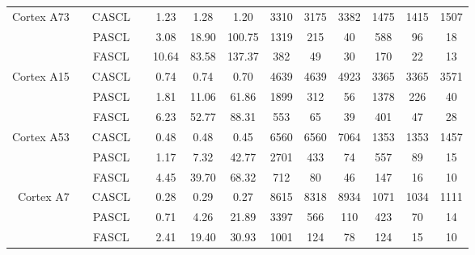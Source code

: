 \begin{table}[t]
{{\begin{tabular}{r|c|c|c c c c| c c c| c c c}
      \hline
      \multirow{3}{*}{\begin{minipage}{0.5in}\centering Cortex A73\end{minipage}} & \multirow{3}{*}{\begin{minipage}{0.5in}\centering 2360\end{minipage}} 
        & CASCL &                     &  1.23  & 1.28   & 1.20   & 3310 & 3175 & 3382 & 1475 & 1415 & 1507 \\
      & & PASCL &                     &  3.08  & 18.90  & 100.75 & 1319 & 215  & 40   & 588  & 96   & 18   \\
      & & FASCL &                     &  10.64 & 83.58  & 137.37 & 382  & 49   & 30   & 170  & 22   & 13   \\

      \hline
      \multirow{3}{*}{\begin{minipage}{0.5in}\centering Cortex A15\end{minipage}} & \multirow{3}{*}{\begin{minipage}{0.5in}\centering 2000\end{minipage}} 
        & CASCL &                     &  0.74  & 0.74   & 0.70   & 4639 & 4639 & 4923 & 3365 & 3365 & 3571 \\
      & & PASCL &                     &  1.81  & 11.06  & 61.86  & 1899 & 312  & 56   & 1378 & 226  & 40   \\
      & & FASCL &                     &  6.23  & 52.77  & 88.31  & 553  & 65   & 39   & 401  & 47   & 28   \\

      \hline
      \multirow{3}{*}{\begin{minipage}{0.5in}\centering Cortex A53\end{minipage}} & \multirow{3}{*}{\begin{minipage}{0.5in}\centering 1840\end{minipage}} 
        & CASCL &                     &  0.48  & 0.48   & 0.45   & 6560 & 6560 & 7064 & 1353 & 1353 & 1457 \\
      & & PASCL &                     &  1.17  & 7.32   & 42.77  & 2701 & 433  & 74   & 557  & 89   & 15   \\
      & & FASCL &                     &  4.45  & 39.70  & 68.32  & 712  & 80   & 46   & 147  & 16   & 10   \\

      \hline
      \multirow{3}{*}{\begin{minipage}{0.5in}\centering Cortex A7\end{minipage}} & \multirow{3}{*}{\begin{minipage}{0.5in}\centering 1400\end{minipage}} 
        & CASCL &                     &  0.28  & 0.29   & 0.27   & 8615 & 8318 & 8934 & 1071 & 1034 & 1111 \\
      & & PASCL &                     &  0.71  & 4.26   & 21.89  & 3397 & 566  & 110  & 423  & 70   & 14   \\
      & & FASCL &                     &  2.41  & 19.40  & 30.93  & 1001 & 124  & 78   & 124  & 15   & 10   \\


\end{tabular}}}
\end{table}
